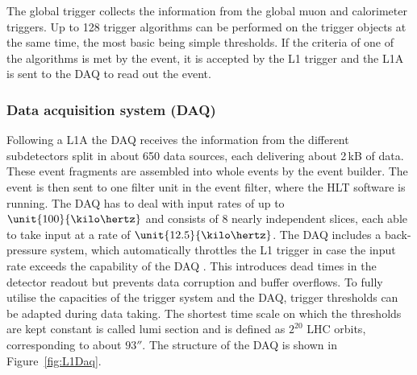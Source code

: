 The global trigger collects the information from the global muon and calorimeter triggers. Up to 128 trigger algorithms can be performed on the trigger objects at the same time, the most basic being simple \pt thresholds. If the criteria of one of the algorithms is met by the event, it is accepted by the L1 trigger and the L1A is sent to the DAQ to read out the event.  


\subsubsection*{Data acquisition system (DAQ)}
Following a L1A the DAQ receives the information from the different subdetectors split in about 650 data sources, each delivering about 2\,kB of data. These event fragments are assembled into whole events by the event builder. The event is then sent to one filter unit in the event filter, where the HLT software is running. The DAQ has to deal with input rates of up to $\unit{100}{\kilo\hertz}$ and consists of 8 nearly independent slices, each able to take input at a rate of $\unit{12.5}{\kilo\hertz}$. The DAQ includes a back-pressure system, which automatically throttles the L1 trigger in case the input rate exceeds the capability of the DAQ . This introduces dead times in the detector readout but prevents data corruption and buffer overflows. To fully utilise the capacities of the trigger system and the DAQ, trigger thresholds can be adapted during data taking. The shortest time scale on which the thresholds are kept constant is called lumi section and is defined as $2^{20}$ LHC orbits, corresponding to about $\unit{93}{\second}$. The structure of the DAQ is shown in Figure~\ref{fig:L1Daq}.

